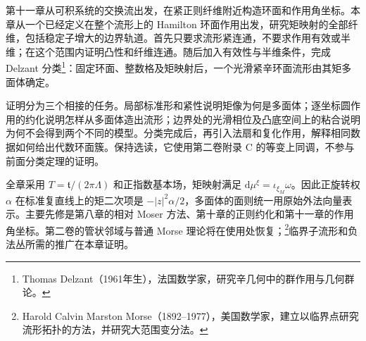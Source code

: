 \ProseParagraphBreak

第十一章从可积系统的交换流出发，在紧正则纤维附近构造环面和作用角坐标。本章从一个已经定义在整个流形上的 Hamilton 环面作用出发，研究矩映射的全部纤维，包括稳定子增大的边界轨道。首先只要求流形紧连通，不要求作用有效或半维；在这个范围内证明凸性和纤维连通。随后加入有效性与半维条件，完成 Delzant 分类\footnote{Thomas Delzant（1961年生），法国数学家，研究辛几何中的群作用与几何群论。}：固定环面、整数格及矩映射后，一个光滑紧辛环面流形由其矩多面体确定。

\ProseParagraphBreak

证明分为三个相接的任务。局部标准形和紧性说明矩像为何是多面体；逐坐标圆作用的约化说明怎样从多面体造出流形；边界处的光滑相位及凸底空间上的粘合说明为何不会得到两个不同的模型。分类完成后，再引入法扇和复化作用，解释相同数据如何给出代数环面簇。保持选读，它使用第二卷附录 C 的等变上同调，不参与前面分类定理的证明。

\ProseParagraphBreak

全章采用 \(T=\mathfrak t/(2\pi\Lambda)\) 和正指数基本场，矩映射满足 \(\mathrm{d}\mu^\xi=\iota_{\xi_M}\omega\)。因此正旋转权 \(\alpha\) 在标准复直线上的矩二次项是 \(-|z|^2\alpha/2\)，多面体的面则统一用原始外法向量表示。主要先修是第八章的相对 Moser 方法、第十章的正则约化和第十一章的作用角坐标。第二卷的管状邻域与普通 Morse 理论将在使用处恢复；\footnote{Harold Calvin Marston Morse（1892--1977），美国数学家，建立以临界点研究流形拓扑的方法，并研究大范围变分法。}临界子流形和负法丛所需的推广在本章证明。








